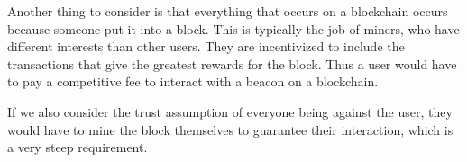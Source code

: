 
Another thing to consider is that everything that occurs on a blockchain occurs because someone put it into a block. This is typically the job of miners, who have different interests than other users. They are incentivized to include the transactions that give the greatest rewards for the block. Thus a user would have to pay a competitive fee to interact with a beacon on a blockchain.

If we also consider the trust assumption of everyone being against the user, they would have to mine the block themselves to guarantee their interaction, which is a very steep requirement.

